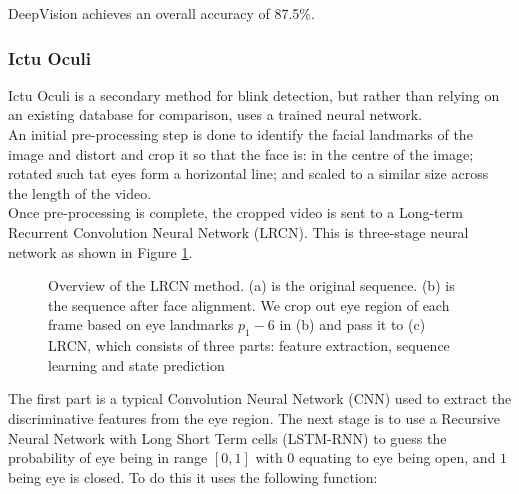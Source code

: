 \documentclass{article}
\begin{document}
DeepVision achieves an overall accuracy of 87.5\%\cite{blinking-pattern}.

\subsubsection{Ictu Oculi}

Ictu Oculi is a secondary method for blink detection, but rather than relying on an existing database for comparison, uses a trained neural network\cite{ictuoculi}.\\

An initial pre-processing step is done to identify the facial landmarks of the image and distort and crop it so that the face is: in the centre of the image; rotated such tat eyes form a horizontal line; and scaled to a similar size across the length of the video.\\

Once pre-processing is complete, the cropped video is sent to a Long-term Recurrent Convolution Neural Network (LRCN). This is three-stage neural network as shown in Figure \ref{fig:LRCN}. 

\begin{figure}[H]
    \centering
    \caption{Overview of the LRCN method. (a) is the original sequence. (b) is the sequence after face alignment. We crop out eye region of each frame based on eye landmarks $p_1-6$ in (b) and pass it to (c) LRCN, which consists of three parts: feature extraction, sequence learning and state prediction\cite{ictuoculi}}
    \label{fig:LRCN}
\end{figure}

The first part is a typical Convolution Neural Network (CNN) used to extract the discriminative features from the eye region. The next stage is to use a Recursive Neural Network with Long Short Term cells (LSTM-RNN) to guess the probability of eye being in range $[0,1]$ with $0$ equating to eye being open, and $1$ being eye is closed. To do this it uses the following function:
\end{document}
